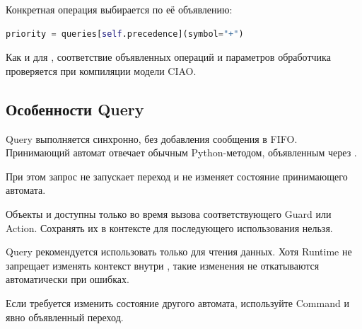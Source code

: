 Конкретная операция выбирается по её объявлению:

\begin{lstlisting}[language=Python,numbers=none]
priority = queries[self.precedence](symbol="+")
\end{lstlisting}

Как и для , соответствие объявленных
операций и параметров обработчика проверяется
при компиляции модели CIAO.

\subsection{Особенности Query}

Query выполняется синхронно, без добавления
сообщения в FIFO. Принимающий автомат отвечает
обычным Python-методом, объявленным через
.

При этом запрос не запускает переход и не изменяет
состояние принимающего автомата.

Объекты  и  доступны только
во время вызова соответствующего Guard или Action.
Сохранять их в контексте для последующего
использования нельзя.

\begin{importantbox}
Query рекомендуется использовать только для чтения
данных. Хотя Runtime не запрещает изменять контекст
внутри , такие изменения
не откатываются автоматически при ошибках.

Если требуется изменить состояние другого автомата,
используйте Command и явно объявленный переход.
\end{importantbox}
